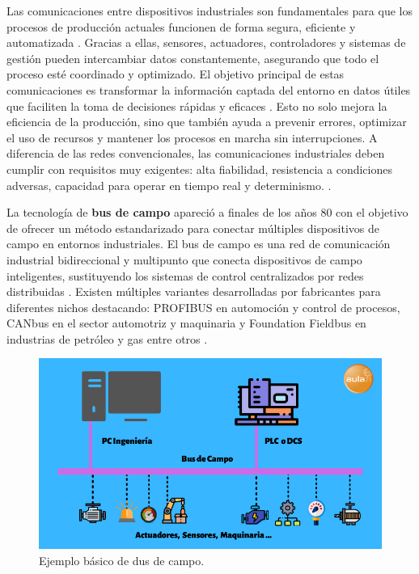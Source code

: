 Las comunicaciones entre dispositivos industriales son fundamentales para que los procesos de producción actuales funcionen de forma segura, eficiente y automatizada \cite{intro_com}. Gracias a ellas, sensores, actuadores, controladores y sistemas de gestión pueden intercambiar datos constantemente, asegurando que todo el proceso esté coordinado y optimizado. El objetivo principal de estas comunicaciones es transformar la información captada del entorno en datos útiles que faciliten la toma de decisiones rápidas y eficaces \cite{intro_com}. Esto no solo mejora la eficiencia de la producción, sino que también ayuda a prevenir errores, optimizar el uso de recursos y mantener los procesos en marcha sin interrupciones. A diferencia de las redes convencionales, las comunicaciones industriales deben cumplir con requisitos muy exigentes: alta fiabilidad, resistencia a condiciones adversas, capacidad para operar en tiempo real y determinismo. \cite{intro_com}. 

La tecnología de \textbf{bus de campo} apareció a finales de los años 80 con el objetivo de ofrecer un método estandarizado para conectar múltiples dispositivos de campo en entornos industriales. El bus de campo es una red de comunicación industrial bidireccional y multipunto que conecta dispositivos de campo inteligentes, sustituyendo los sistemas de control centralizados por redes distribuidas \cite{info_bus}. Existen múltiples variantes desarrolladas por fabricantes para diferentes nichos destacando: PROFIBUS en automoción y control de procesos, CANbus en el sector automotriz y maquinaria y Foundation Fieldbus en industrias de petróleo y gas entre otros \cite{bus_vs_ethernet}.

\begin{figure} [h!]
  \begin{center}
    \includegraphics[width=15cm]{figs/bus_de_campo}
  \end{center}
  \caption{\centering Ejemplo básico de dus de campo. \cite{info_bus}}
  \label{fig:bus_de_campo}
\end{figure} 

